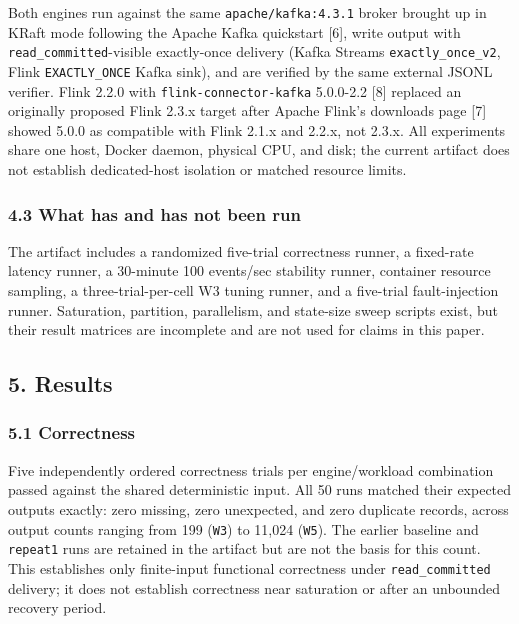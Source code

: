 \documentclass[
]{article}
\begin{document}
Both engines run against the same \texttt{apache/kafka:4.3.1} broker
brought up in KRaft mode following the Apache Kafka quickstart {[}6{]},
write output with \texttt{read\_committed}-visible exactly-once delivery
(Kafka Streams \texttt{exactly\_once\_v2}, Flink \texttt{EXACTLY\_ONCE}
Kafka sink), and are verified by the same external JSONL verifier. Flink
2.2.0 with \texttt{flink-connector-kafka} 5.0.0-2.2 {[}8{]} replaced an
originally proposed Flink 2.3.x target after Apache Flink's downloads
page {[}7{]} showed 5.0.0 as compatible with Flink 2.1.x and 2.2.x, not
2.3.x. All experiments share one host, Docker daemon, physical CPU, and
disk; the current artifact does not establish dedicated-host isolation
or matched resource limits.

\hypertarget{what-has-and-has-not-been-run}{%
\subsubsection{4.3 What has and has not been
run}\label{what-has-and-has-not-been-run}}

The artifact includes a randomized five-trial correctness runner, a
fixed-rate latency runner, a 30-minute 100 events/sec stability runner,
container resource sampling, a three-trial-per-cell W3 tuning runner,
and a five-trial fault-injection runner. Saturation, partition,
parallelism, and state-size sweep scripts exist, but their result
matrices are incomplete and are not used for claims in this paper.

\hypertarget{results}{%
\subsection{5. Results}\label{results}}

\hypertarget{correctness}{%
\subsubsection{5.1 Correctness}\label{correctness}}

Five independently ordered correctness trials per engine/workload
combination passed against the shared deterministic input. All 50 runs
matched their expected outputs exactly: zero missing, zero unexpected,
and zero duplicate records, across output counts ranging from 199
(\texttt{W3}) to 11,024 (\texttt{W5}). The earlier baseline and
\texttt{repeat1} runs are retained in the artifact but are not the basis
for this count. This establishes only finite-input functional
correctness under \texttt{read\_committed} delivery; it does not
establish correctness near saturation or after an unbounded recovery
period.
\end{document}
